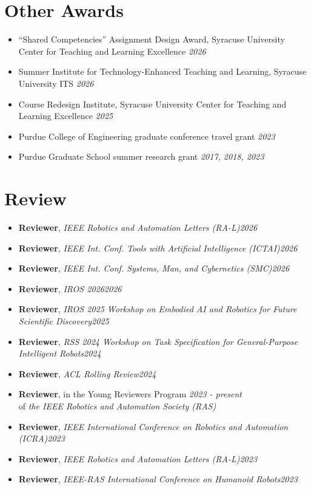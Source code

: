 \documentclass[12pt]{article}
\begin{document}
\section*{Other Awards}
\begin{itemize}[leftmargin=1.5em]
\item[] ``Shared Competencies'' Assignment Design Award, Syracuse University Center for Teaching and Learning Excellence  \hfill {\em 2026}
\item[] Summer Institute for Technology-Enhanced Teaching and Learning, Syracuse University ITS  \hfill {\em 2026}
\item[] Course Redesign Institute, Syracuse University Center for Teaching and Learning Excellence  \hfill {\em 2025}
\item[] Purdue College of Engineering graduate conference travel grant \hfill {\em 2023}
\item[] Purdue Graduate School summer research grant \hfill {\em 2017, 2018, 2023}
\end{itemize}

\vspace{-0.1cm}

\section*{Review}
\begin{itemize}[leftmargin=1.5em]
\item[] {\bf Reviewer}, {\em {IEEE} Robotics and Automation Letters (RA-L)}\hfill {\em 2026}
\item[] {\bf Reviewer}, {\em {IEEE} Int. Conf. Tools with Artificial Intelligence (ICTAI)}\hfill {\em 2026}
\item[] {\bf Reviewer}, {\em IEEE Int. Conf. Systems, Man, and Cybernetics (SMC)}\hfill {\em 2026}
\item[] {\bf Reviewer}, {\em IROS 2026}\hfill {\em 2026}
\item[] {\bf Reviewer}, {\em IROS 2025 Workshop on Embodied AI and Robotics for Future Scientific Discovery}\hfill {\em 2025}
\item[] {\bf Reviewer}, {\em RSS 2024 Workshop on Task Specification for General-Purpose Intelligent Robots}\hfill {\em 2024}
\item[] {\bf Reviewer}, {\em {ACL} Rolling Review}\hfill {\em 2024}
\item[] {\bf Reviewer}, in  the Young Reviewers Program \hfill {\em 2023 - present}\\ of {\em the IEEE Robotics and Automation Society (RAS)} 
\item[] {\bf Reviewer}, {\em {IEEE} International Conference on Robotics and Automation (ICRA)}\hfill {\em 2023}
\item[] {\bf Reviewer}, {\em {IEEE} Robotics and Automation Letters (RA-L)}\hfill {\em 2023}
\item[] {\bf Reviewer}, {\em {IEEE-RAS} International Conference on Humanoid Robots}\hfill {\em 2023}
\end{itemize}
\vspace{-0.1cm}
\end{document}
